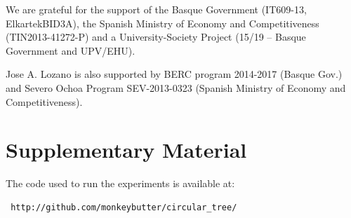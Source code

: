 \documentclass[times,twocolumn,final,authoryear]{elsarticle}
\begin{document}
We are grateful for the support of the Basque Government (IT609-13, ElkartekBID3A), the Spanish Ministry of Economy and Competitiveness (TIN2013-41272-P) and a University-Society Project (15/19 – Basque Government and UPV/EHU). 

Jose A. Lozano is also supported by BERC program 2014-2017 (Basque Gov.) and Severo Ochoa Program SEV-2013-0323 (Spanish Ministry of Economy and Competitiveness).






\section*{Supplementary Material}

The code used to run the experiments is available at:

\begin{verbatim}
 http://github.com/monkeybutter/circular_tree/
\end{verbatim}
\end{document}

